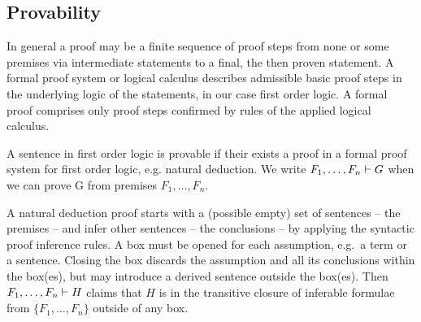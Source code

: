 
\subsection{Provability}

In general a proof may be a finite sequence of proof steps
from none or some premises via intermediate statements
to a final, the then proven statement.
A formal proof system or logical calculus describes admissible basic proof steps
in the underlying logic of the statements, in our case first order logic.
A formal proof comprises only proof steps confirmed by rules of the applied logical calculus.



\begin{definition}A sentence in first order logic is provable
	if their exists a proof in a formal proof system for first order logic, e.g. natural deduction.
	We write
	\( F_1, \ldots, F_n \vdash G \)
	when we can prove G from premises \( F_1,\ldots,F_n \).
\end{definition}

A natural deduction proof starts with a (possible empty) set of sentences -- the premises --
and infer other sentences -- the conclusions -- by applying the syntactic proof inference rules.
A box must be opened for each assumption, e.g.~a term or a sentence.
Closing the box discards the assumption and all its conclusions within the box(es),
but may introduce a derived sentence outside the box(es).
Then \( F_1,\ldots,F_n \vdash H \) claims that \( H \)
is in the transitive closure of inferable formulae from \( \{ F_1,\ldots,F_n\} \) outside of any box.

